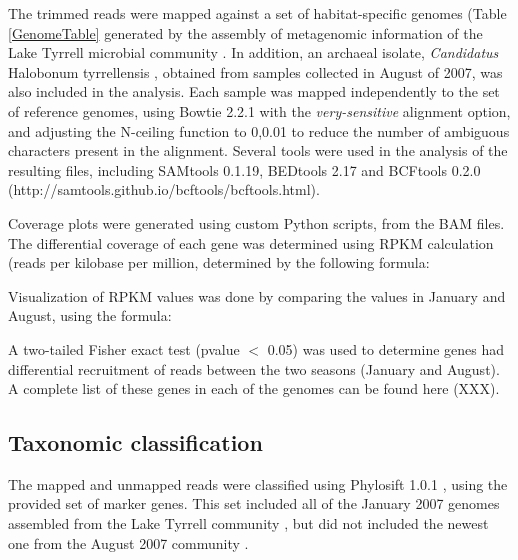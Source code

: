 The trimmed reads were mapped against a set of habitat-specific genomes (Table \ref{GenomeTable} generated by the assembly of metagenomic information of the Lake Tyrrell microbial community \cite{Narasingarao:2012kp,Podell:2013kx,Podell:2013fp}. In addition, an archaeal isolate, \textit{Candidatus} Halobonum tyrrellensis \cite{Ugalde:2013hb}, obtained from samples collected in August of 2007, was also included in the analysis. Each sample was mapped independently to the set of reference genomes, using Bowtie 2.2.1 \cite{Langmead:2012jh} with the \textit{very-sensitive} alignment option, and adjusting the N-ceiling function to 0,0.01 to reduce the number of ambiguous characters present in the alignment. Several tools were used in the analysis of the resulting files, including SAMtools 0.1.19\cite{Li:2009ka}, BEDtools 2.17 \cite{Quinlan:2010km} and BCFtools 0.2.0 (http://samtools.github.io/bcftools/bcftools.html).

Coverage plots were generated using custom Python scripts, from the BAM files. The differential coverage of each gene was determined using RPKM calculation (reads per kilobase per million, determined by the following formula:

\begin{center}
\end{center}

Visualization of RPKM values was done by comparing the values in January and August, using the formula:

\begin{center}
\end{center}

A two-tailed Fisher exact test (pvalue $<$ 0.05) was used to determine genes had differential recruitment of reads between the two seasons (January and August). A complete list of these genes in each of the genomes can be found here (XXX).

\subsection{Taxonomic classification}

The mapped and unmapped reads were classified using Phylosift 1.0.1 \cite{Darling:2014ej}, using the provided set of marker genes. This set included all of the January 2007 genomes assembled from the Lake Tyrrell community \cite{Narasingarao:2012kp,Podell:2013kx}, but did not included the newest one from the August 2007 community \cite{Podell:2013fp}.

